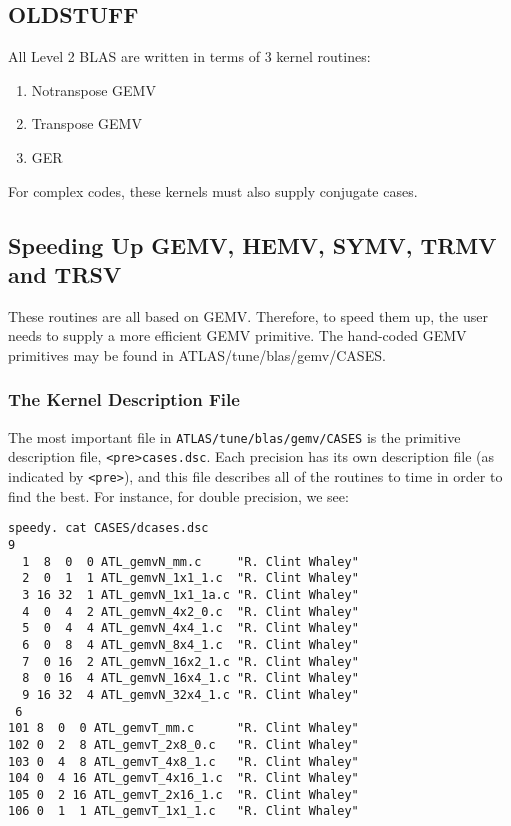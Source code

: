 \documentclass[11pt]{article}
\begin{document}
\subsection{OLDSTUFF}
{
All Level 2 BLAS are written in terms of 3 kernel routines:
\begin{enumerate}
\item Notranspose GEMV
\item Transpose GEMV
\item GER
\end{enumerate}

For complex codes, these kernels must also supply conjugate cases.

\subsection{Speeding Up GEMV, HEMV, SYMV, TRMV and TRSV}
These routines are all based on GEMV.  Therefore, to speed them up, the user
needs to supply a more efficient GEMV primitive.  The hand-coded GEMV
primitives may be found in ATLAS/tune/blas/gemv/CASES.

\subsubsection{The Kernel Description File}
\label{sec-gemvdesc}

The most important file in {\tt ATLAS/tune/blas/gemv/CASES}
is the primitive description
file, \verb+<pre>cases.dsc+.  Each precision has its own description file (as
indicated by \verb+<pre>+), and this file describes all of the routines to
time in order to find the best.  For instance, for double precision, we see:
\begin{verbatim}
speedy. cat CASES/dcases.dsc 
9
  1  8  0  0 ATL_gemvN_mm.c     "R. Clint Whaley"
  2  0  1  1 ATL_gemvN_1x1_1.c  "R. Clint Whaley"
  3 16 32  1 ATL_gemvN_1x1_1a.c "R. Clint Whaley"
  4  0  4  2 ATL_gemvN_4x2_0.c  "R. Clint Whaley"
  5  0  4  4 ATL_gemvN_4x4_1.c  "R. Clint Whaley"
  6  0  8  4 ATL_gemvN_8x4_1.c  "R. Clint Whaley"
  7  0 16  2 ATL_gemvN_16x2_1.c "R. Clint Whaley"
  8  0 16  4 ATL_gemvN_16x4_1.c "R. Clint Whaley"
  9 16 32  4 ATL_gemvN_32x4_1.c "R. Clint Whaley"
 6
101 8  0  0 ATL_gemvT_mm.c      "R. Clint Whaley"
102 0  2  8 ATL_gemvT_2x8_0.c   "R. Clint Whaley"
103 0  4  8 ATL_gemvT_4x8_1.c   "R. Clint Whaley"
104 0  4 16 ATL_gemvT_4x16_1.c  "R. Clint Whaley"
105 0  2 16 ATL_gemvT_2x16_1.c  "R. Clint Whaley"
106 0  1  1 ATL_gemvT_1x1_1.c   "R. Clint Whaley"
\end{verbatim}

}
\end{document}
